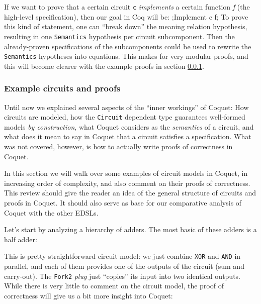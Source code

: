             If we want to prove that a certain circuit \texttt{c} \emph{implements} a certain
            function \emph{f} (the high-level specification), then our goal in Coq will be:
            \coq;Implement c f; To prove this kind of statement, one can ``break down'' the meaning
            relation hypothesis, resulting in one \texttt{Semantics} hypothesis per circuit
            subcomponent.  Then the already-proven specifications of the subcomponents could be used
            to rewrite the \texttt{Semantics} hypotheses into equations. This makes for very modular
            proofs, and this will become clearer with the example proofs in section
            \ref{subsubsec:coquet-circuits}.


        \subsubsection{Example circuits and proofs}
        \label{subsubsec:coquet-circuits}
            Until now we explained several aspects of the ``inner workings'' of Coquet: How
            circuits are modeled, how the \texttt{Circuit} dependent type guarantees well-formed
            models \emph{by construction}, what Coquet considers as the \emph{semantics} of a
            circuit, and what does it mean to say in Coquet that a circuit satisfies a
            specification. What was not covered, however, is how to actually write proofs of
            correctness in Coquet.

            In this section we will walk over some examples of circuit models in Coquet, in
            increasing order of complexity, and also comment on their proofs of correctness. This
            review should give the reader an idea of the general structure of circuits and proofs in
            Coquet. It should also serve as base for our comparative analysis of Coquet with the
            other \acp{EDSL}.

            Let's start by analyzing a hierarchy of adders. The most basic of these adders is a half
            adder:


            This is pretty straightforward circuit model: we just combine \texttt{XOR} and
            \texttt{AND} in parallel, and each of them provides one of the outputs of the circuit
            (sum and carry-out). The \texttt{Fork2} \emph{plug} just ``copies'' its input into two
            identical outputs. While there is very little to comment on the circuit model, the proof
            of correctness will give us a bit more insight into Coquet:

